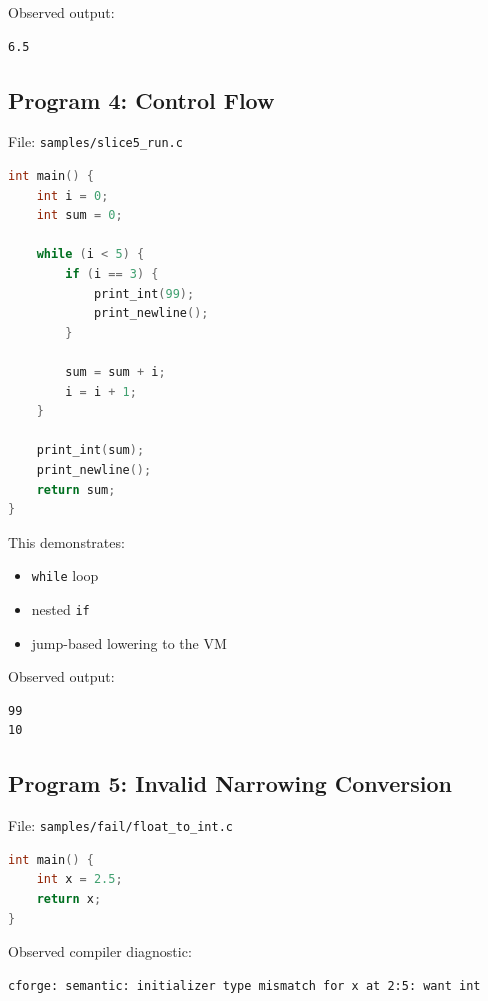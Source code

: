 \documentclass[11pt,a4paper]{article}
\begin{document}
Observed output:

\begin{lstlisting}
6.5
\end{lstlisting}

\subsection*{Program 4: Control Flow}

File: \texttt{samples/slice5\_run.c}

\begin{lstlisting}[language=C]
int main() {
    int i = 0;
    int sum = 0;

    while (i < 5) {
        if (i == 3) {
            print_int(99);
            print_newline();
        }

        sum = sum + i;
        i = i + 1;
    }

    print_int(sum);
    print_newline();
    return sum;
}
\end{lstlisting}

This demonstrates:

\begin{itemize}[leftmargin=2em]
    \item \texttt{while} loop
    \item nested \texttt{if}
    \item jump-based lowering to the VM
\end{itemize}

Observed output:

\begin{lstlisting}
99
10
\end{lstlisting}

\subsection*{Program 5: Invalid Narrowing Conversion}

File: \texttt{samples/fail/float\_to\_int.c}

\begin{lstlisting}[language=C]
int main() {
    int x = 2.5;
    return x;
}
\end{lstlisting}

Observed compiler diagnostic:

\begin{lstlisting}
cforge: semantic: initializer type mismatch for x at 2:5: want int
\end{lstlisting}
\end{document}
